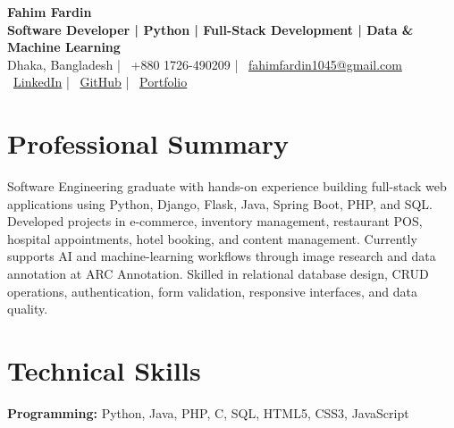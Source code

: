 \documentclass[a4paper,10pt]{article}
\begin{document}

\begin{center}

{\fontsize{19}{22}\selectfont
\textbf{Fahim Fardin}}\\[4pt]

{\fontsize{9.5}{11}\selectfont
\textbf{Software Developer | Python | Full-Stack Development |
Data \& Machine Learning}}\\[6pt]

{\fontsize{9}{10.5}\selectfont
Dhaka, Bangladesh
\quad | \quad
\faPhone\ +880 1726-490209
\quad | \quad
\faEnvelope\
\href{mailto:fahimfardin1045@gmail.com}
{fahimfardin1045@gmail.com}
}\\[4pt]

{\fontsize{9}{10.5}\selectfont
\faLinkedin\
\href{https://www.linkedin.com/in/fahim-fardin-28616822a}
{LinkedIn}
\quad | \quad
\faGithub\
\href{https://github.com/fahim-fardin-1045}
{GitHub}
\quad | \quad
\faGlobe\
\href{https://fahim-fardin-1045.github.io/fahim-portfolio/}
{Portfolio}
}

\end{center}

\vspace{-2pt}


\section*{Professional Summary}

Software Engineering graduate with hands-on experience building
full-stack web applications using Python, Django, Flask, Java,
Spring Boot, PHP, and SQL. Developed projects in e-commerce,
inventory management, restaurant POS, hospital appointments,
hotel booking, and content management. Currently supports
AI and machine-learning workflows through image research and
data annotation at ARC Annotation. Skilled in relational database
design, CRUD operations, authentication, form validation,
responsive interfaces, and data quality.


\section*{Technical Skills}

\textbf{Programming:}
Python, Java, PHP, C, SQL, HTML5, CSS3, JavaScript
\end{document}
